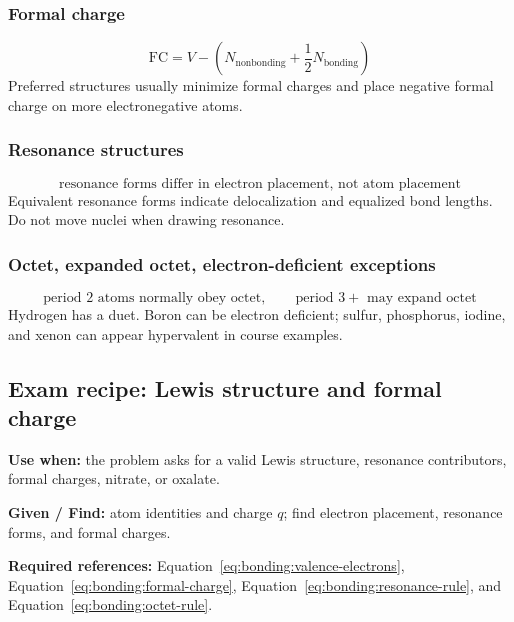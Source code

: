 \subsubsection{Formal charge}
\begin{equation}
\label{eq:bonding:formal-charge}
\mathrm{FC}=V-\left(N_{\mathrm{nonbonding}}+\frac12N_{\mathrm{bonding}}\right)
\end{equation}
Preferred structures usually minimize formal charges and place negative formal charge on more electronegative atoms.

\subsubsection{Resonance structures}
\begin{equation}
\label{eq:bonding:resonance-rule}
\text{resonance forms differ in electron placement, not atom placement}
\end{equation}
Equivalent resonance forms indicate delocalization and equalized bond lengths. Do not move nuclei when drawing resonance.

\subsubsection{Octet, expanded octet, electron-deficient exceptions}
\begin{equation}
\label{eq:bonding:octet-rule}
\text{period 2 atoms normally obey octet}, \qquad
\text{period }3+\text{ may expand octet}
\end{equation}
Hydrogen has a duet. Boron can be electron deficient; sulfur, phosphorus, iodine, and xenon can appear hypervalent in course examples.

\subsection{Exam recipe: Lewis structure and formal charge}
\textbf{Use when:} the problem asks for a valid Lewis structure, resonance contributors, formal charges, nitrate, or oxalate.

\textbf{Given / Find:} atom identities and charge \(q\); find electron placement, resonance forms, and formal charges.

\textbf{Required references:} Equation~\ref{eq:bonding:valence-electrons}, Equation~\ref{eq:bonding:formal-charge}, Equation~\ref{eq:bonding:resonance-rule}, and Equation~\ref{eq:bonding:octet-rule}.

